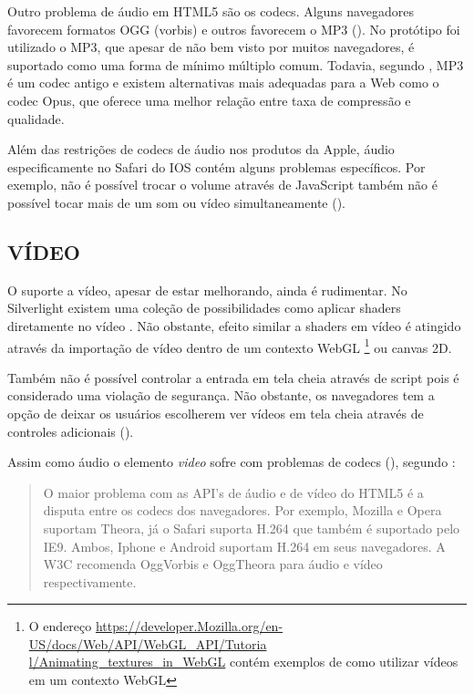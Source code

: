 Outro problema de áudio em HTML5 são os codecs. Alguns navegadores
favorecem formatos OGG (vorbis) e outros favorecem o MP3 (). No
protótipo foi utilizado o MP3, que apesar de não bem visto por
muitos navegadores, é suportado como uma forma de mínimo múltiplo
comum. Todavia, segundo \citet{opus}, MP3 é um codec antigo e existem
alternativas mais adequadas para a Web como o codec Opus, que oferece
uma melhor relação entre taxa de compressão e qualidade.

Além das restrições de codecs de áudio nos produtos da Apple,
áudio especificamente no Safari do IOS contém alguns problemas específicos.
Por exemplo, não é possível trocar o volume através de
JavaScript também não é possível tocar mais de um som ou vídeo
simultaneamente \autocite{unsolvedMediaHtmlIssues} ().

\subsection{VÍDEO}

O suporte a vídeo, apesar de estar melhorando, ainda é rudimentar.
No Silverlight existem uma coleção de possibilidades como aplicar
shaders diretamente no vídeo \autocite[p. 8]{researchOnHtml}
. Não obstante, efeito similar 
a shaders em vídeo é atingido através da importação de
vídeo dentro de um contexto WebGL \footnote{O endereço
\url{https://developer.Mozilla.org/en-US/docs/Web/API/WebGL_API/Tutoria
l/Animating_textures_in_WebGL} contém exemplos de como utilizar vídeos
em um contexto WebGL} ou canvas 2D.

Também não é possível controlar a entrada em tela cheia através de
script pois é considerado uma violação de segurança. Não obstante,
os navegadores tem a opção de deixar os usuários escolherem ver
vídeos em tela cheia através de controles adicionais \autocite[p.
68]{proHtml5} ().

Assim como áudio o elemento \textit{video} sofre com problemas de
codecs (), segundo \citet{html5Tradeoffs}:
\begin{quote}
O maior problema com as API's de áudio e de vídeo do HTML5 é
a disputa entre os codecs dos navegadores. Por exemplo, Mozilla e
Opera suportam Theora, já o Safari suporta H.264 que também é
suportado pelo IE9. Ambos, Iphone e Android suportam H.264 em seus
navegadores. A W3C recomenda OggVorbis e OggTheora para áudio e vídeo
respectivamente.
\end{quote}

